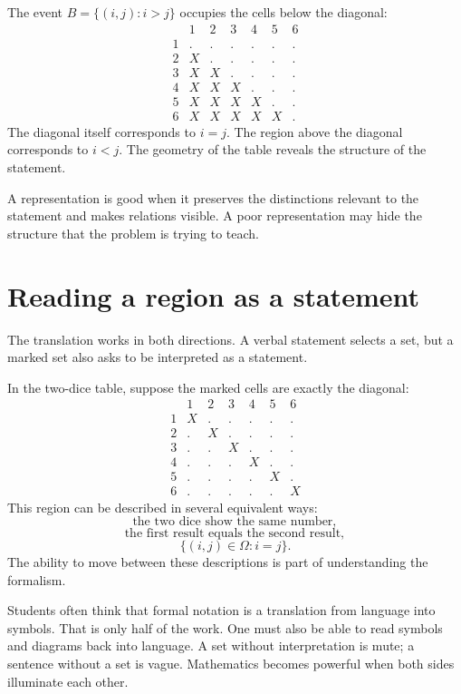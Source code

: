 The event \(B=\{(i,j):i>j\}\) occupies the cells below the diagonal:
\[
\begin{array}{c|cccccc}
 & 1&2&3&4&5&6\\
\hline
1&.&.&.&.&.&.\\
2&X&.&.&.&.&.\\
3&X&X&.&.&.&.\\
4&X&X&X&.&.&.\\
5&X&X&X&X&.&.\\
6&X&X&X&X&X&.
\end{array}
\]
The diagonal itself corresponds to \(i=j\). The region above the diagonal corresponds to \(i<j\). The geometry of the table reveals the structure of the statement.

\begin{remarkbox}
A representation is good when it preserves the distinctions relevant to the statement and makes relations visible. A poor representation may hide the structure that the problem is trying to teach.
\end{remarkbox}

\section{Reading a region as a statement}

The translation works in both directions. A verbal statement selects a set, but a marked set also asks to be interpreted as a statement.

\begin{examplebox}
In the two-dice table, suppose the marked cells are exactly the diagonal:
\[
\begin{array}{c|cccccc}
 & 1&2&3&4&5&6\\
\hline
1&X&.&.&.&.&.\\
2&.&X&.&.&.&.\\
3&.&.&X&.&.&.\\
4&.&.&.&X&.&.\\
5&.&.&.&.&X&.\\
6&.&.&.&.&.&X
\end{array}
\]
This region can be described in several equivalent ways:
\[
\text{the two dice show the same number},
\]
\[
\text{the first result equals the second result},
\]
\[
\{(i,j)\in\Omega:i=j\}.
\]
The ability to move between these descriptions is part of understanding the formalism.
\end{examplebox}

Students often think that formal notation is a translation from language into symbols. That is only half of the work. One must also be able to read symbols and diagrams back into language. A set without interpretation is mute; a sentence without a set is vague. Mathematics becomes powerful when both sides illuminate each other.
